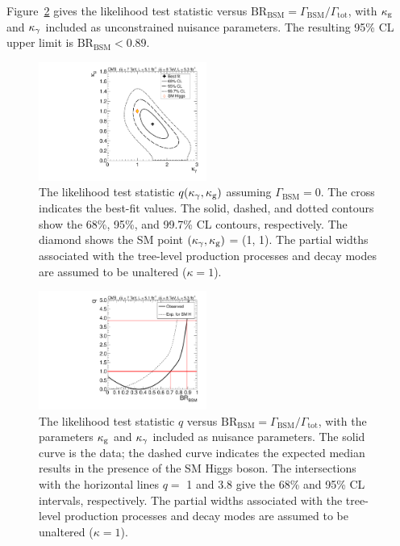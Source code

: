 \documentclass[11pt,twoside,a4paper,cmspaper,final,collab]{cms-tdr}
\begin{document}
Figure~\ref{fig:BSM2} gives the likelihood test statistic versus
$\mathrm{BR}_{\mathrm{BSM}}=\Gamma_{\mathrm{BSM}}/\Gamma_{\text{tot}}$,
with $\kappa_{\mathrm{g}}$ and $\kappa_{\gamma}$ included as unconstrained nuisance parameters.
The resulting 95\% CL upper limit is  $\mathrm{BR}_{\mathrm{BSM}} < 0.89$.


\begin{figure}[bhtp]
\centering
\includegraphics[width=0.49\textwidth]{figures/comb/sqr_kgkglu_scan_2d_comb_HPA}
\caption{
The likelihood test statistic  $q(\kappa_{\gamma}, \kappa_{\mathrm{g}})$ assuming $\Gamma_{\mathrm{BSM}}=0$.
        The cross indicates the best-fit values. The solid, dashed, and dotted contours show the
        68\%, 95\%,  and 99.7\% CL contours, respectively. The diamond shows the SM point
        $(\kappa_{\gamma}, \kappa_{\mathrm{g}})$ = (1, 1).
The partial widths associated with the tree-level production processes
and decay modes are assumed to be unaltered ($\kappa = 1$).
}
\label{fig:BSM1}
\end{figure}

\begin{figure}[bhtp]
\centering
\includegraphics[width=0.49\textwidth]{figures/comb/sqr_brinv_scan_1d_all}
\caption{
The likelihood test statistic $q$ versus $\mathrm{BR}_{\mathrm{BSM}}=\Gamma_{\mathrm{BSM}}/\Gamma_{\mathrm{tot}}$,
        with the parameters $\kappa_{\mathrm{g}}$ and $\kappa_{\gamma}$ included as  nuisance parameters.
        The solid curve is the data; the dashed curve indicates the expected median results in the presence of the SM Higgs boson.
The intersections with the horizontal lines $q=$ 1 and 3.8 give the 68\% and 95\% CL intervals, respectively.
The partial widths associated with the tree-level production processes
and decay modes are assumed to be unaltered ($\kappa = 1$).
}
\label{fig:BSM2}
\end{figure}
\end{document}
